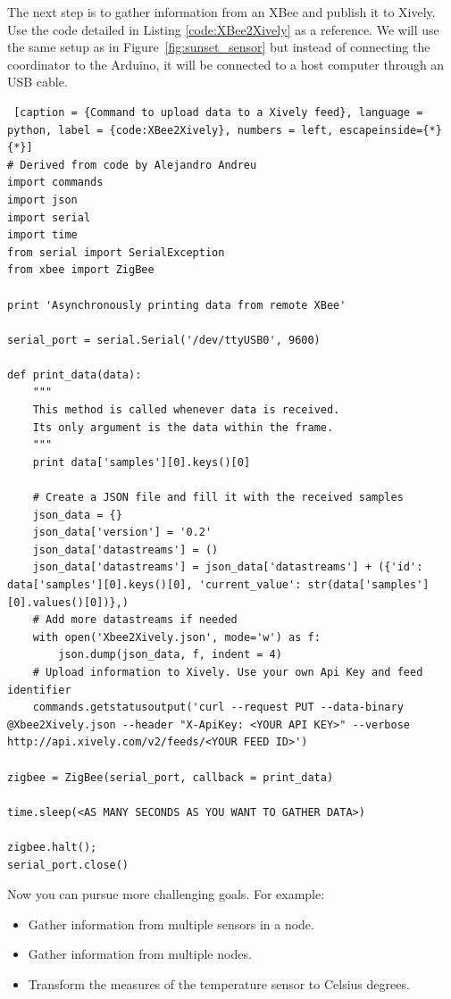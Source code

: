 The next step is to gather information from an XBee and publish it to Xively.
Use the code detailed in Listing \ref{code:XBee2Xively} as a reference. We will use the same setup as in Figure~\ref{fig:sunset_sensor} but instead of connecting the coordinator to the Arduino, it will be connected to a host computer through an USB cable.

\begin{lstlisting} [caption = {Command to upload data to a Xively feed}, language = python, label = {code:XBee2Xively}, numbers = left, escapeinside={*}{*}]
# Derived from code by Alejandro Andreu
import commands
import json
import serial
import time
from serial import SerialException
from xbee import ZigBee

print 'Asynchronously printing data from remote XBee'

serial_port = serial.Serial('/dev/ttyUSB0', 9600)

def print_data(data):
    """
    This method is called whenever data is received.
    Its only argument is the data within the frame.
    """
    print data['samples'][0].keys()[0]

    # Create a JSON file and fill it with the received samples
    json_data = {}
    json_data['version'] = '0.2'
    json_data['datastreams'] = ()
    json_data['datastreams'] = json_data['datastreams'] + ({'id': data['samples'][0].keys()[0], 'current_value': str(data['samples'][0].values()[0])},)
    # Add more datastreams if needed
    with open('Xbee2Xively.json', mode='w') as f:
        json.dump(json_data, f, indent = 4)
    # Upload information to Xively. Use your own Api Key and feed identifier
    commands.getstatusoutput('curl --request PUT --data-binary @Xbee2Xively.json --header "X-ApiKey: <YOUR API KEY>" --verbose http://api.xively.com/v2/feeds/<YOUR FEED ID>')

zigbee = ZigBee(serial_port, callback = print_data)

time.sleep(<AS MANY SECONDS AS YOU WANT TO GATHER DATA>)

zigbee.halt();
serial_port.close()
\end{lstlisting}

Now you can pursue more challenging goals.
For example:
\begin{itemize}
\item Gather information from multiple sensors in a node.
\item Gather information from multiple nodes.
\item Transform the measures of the temperature sensor to Celsius degrees.
\end{itemize}

